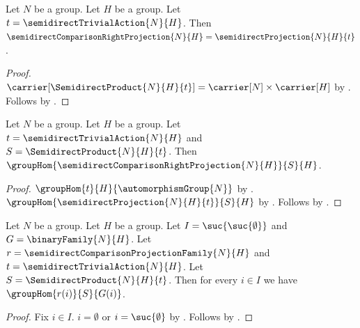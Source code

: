 \begin{proposition}\label{semidirect_comparison_right_projection_eq}
    Let $N$ be a group.
    Let $H$ be a group.
    Let $t=\semidirectTrivialAction{N}{H}$.
    Then
        $\semidirectComparisonRightProjection{N}{H}=
            \semidirectProjection{N}{H}{t}$.
\end{proposition}
\begin{proof}
    $\carrier[\SemidirectProduct{N}{H}{t}]=
        \carrier[N]\times\carrier[H]$ by
        .
    Follows by
        .
\end{proof}

\begin{theorem}\label{semidirect_comparison_right_projection_hom}
    Let $N$ be a group.
    Let $H$ be a group.
    Let $t=\semidirectTrivialAction{N}{H}$ and
        $S=\SemidirectProduct{N}{H}{t}$.
    Then $\groupHom{\semidirectComparisonRightProjection{N}{H}}{S}{H}$.
\end{theorem}
\begin{proof}
    $\groupHom{t}{H}{\automorphismGroup{N}}$ by
        .
    $\groupHom{\semidirectProjection{N}{H}{t}}{S}{H}$ by
        .
    Follows by .
\end{proof}

\begin{proposition}\label{semidirect_comparison_projection_family_homs}
    Let $N$ be a group.
    Let $H$ be a group.
    Let $I=\suc{\suc{\emptyset}}$ and $G=\binaryFamily{N}{H}$.
    Let $r=\semidirectComparisonProjectionFamily{N}{H}$ and
        $t=\semidirectTrivialAction{N}{H}$.
    Let $S=\SemidirectProduct{N}{H}{t}$.
    Then for every $i\in I$ we have $\groupHom{r(i)}{S}{G(i)}$.
\end{proposition}
\begin{proof}
    Fix $i\in I$.
    $i=\emptyset$ or $i=\suc{\emptyset}$ by
        .
    Follows by
        .
\end{proof}

